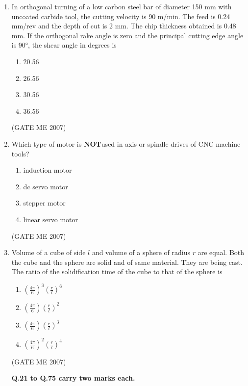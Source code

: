 \documentclass[journal]{IEEEtran}
\begin{document}
\begin{enumerate}
\item In orthogonal turning of a low carbon steel bar of diameter 150 mm with uncoated carbide tool, the cutting velocity is 90 m/min. The feed is 0.24 mm/rev and the depth of cut is 2 mm. The chip thickness obtained is 0.48 mm. If the orthogonal rake angle is zero and the principal cutting edge angle is 90°, the shear angle in degrees is
\begin{multicols}{4}
\begin{enumerate}
\item 20.56
\item 26.56
\item 30.56
\item 36.56
\end{enumerate}
\end{multicols}
\hfill (GATE ME 2007)

\item Which type of motor is \textbf{NOT}used in axis or spindle drives of CNC machine tools?
\begin{multicols}{2}
\begin{enumerate}
\item induction motor
\item dc servo motor
\item stepper motor
\item linear servo motor
\end{enumerate}
\end{multicols}
\hfill (GATE ME 2007)

\item Volume of a cube of side $ l $ and volume of a sphere of radius $ r $ are equal. Both the cube and the sphere are solid and of same material. They are being cast. The ratio of the solidification time of the cube to that of the sphere is
\begin{multicols}{4}
\begin{enumerate}
\item $ \left( \frac{4\pi}{6} \right)^3 \left( \frac{r}{l} \right)^6 $
\item $ \left( \frac{4\pi}{6} \right) \left( \frac{r}{l} \right)^2 $
\item $ \left( \frac{4\pi}{6} \right) \left( \frac{r}{l} \right)^3 $
\item $ \left( \frac{4\pi}{6} \right)^2 \left( \frac{r}{l} \right)^4 $
\end{enumerate}
\end{multicols}
\hfill (GATE ME 2007)

\begin{center}
\textbf{Q.21 to Q.75 carry two marks each.}
\end{center}


\end{enumerate}
\end{document}
